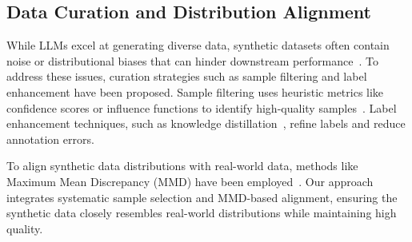 \subsection{Data Curation and Distribution Alignment}

While LLMs excel at generating diverse data, synthetic datasets often contain noise or distributional biases that can hinder downstream performance~\citep{regen}. To address these issues, curation strategies such as sample filtering and label enhancement have been proposed. Sample filtering uses heuristic metrics like confidence scores or influence functions to identify high-quality samples~\citep{seedat2023curated, progen}. Label enhancement techniques, such as knowledge distillation~\citep{xiao2023freeal}, refine labels\citep{wan2024tnt} and reduce annotation errors\citep{li2023coannotating}. 

To align synthetic data distributions with real-world data, methods like Maximum Mean Discrepancy (MMD) have been employed~\citep{survey_llmsdrivensyntheticdata}. Our approach integrates systematic sample selection and MMD-based alignment, ensuring the synthetic data closely resembles real-world distributions while maintaining high quality.


